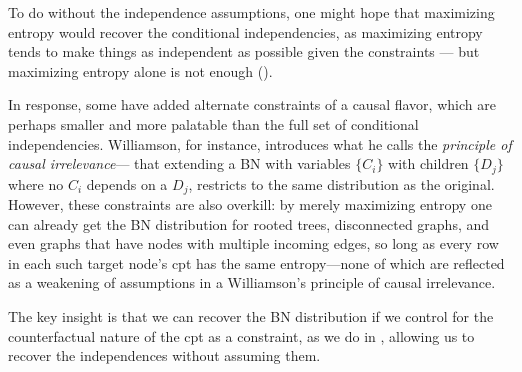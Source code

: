 \documentclass{article}
\numberwithin{equation}{section}
\begin{document}
	To do without the independence assumptions, one might hope that maximizing entropy would recover the conditional independencies, as maximizing entropy tends to make things as independent as possible given the constraints --- but maximizing entropy alone is not enough ().
\begin{vfull}	
	In response, some \cite{williamson2001foundations}\cite{holmes2001independence} have added alternate constraints of a causal flavor, which are perhaps smaller and more palatable than the full set of conditional independencies.  Williamson, for instance, introduces what he calls the \emph{principle of causal irrelevance}--- that extending a BN with variables $\{C_i\}$ with children $\{D_j\}$ where no $C_i$ depends on a $D_j$, restricts to the same distribution as the original.  However, these constraints are also overkill: by merely maximizing entropy one can already get the BN distribution for rooted trees, disconnected graphs, and even graphs that have nodes with multiple incoming edges, so long as every row in each such target node's cpt has the same entropy---none of which are reflected as a weakening of assumptions in a Williamson's principle of causal irrelevance.
	

\end{vfull}
The key insight
	is that we can recover the BN distribution if we control for
        the counterfactual nature of the cpt as a constraint, as we
        do in , allowing us to recover the
        independences without assuming them. 
\end{document}
